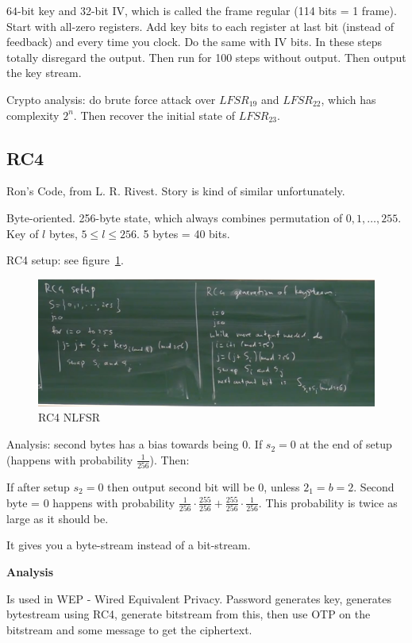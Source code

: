 \documentclass[language=english,number=]{homework}
\begin{document}
$64$-bit key and 32-bit IV, which is called the frame regular (114 bits = 1 frame).
Start with all-zero registers.
Add key bits to each register at last bit (instead of feedback) and every time you clock.
Do the same with IV bits.
In these steps totally disregard the output.
Then run for 100 steps without output.
Then output the key stream.

Crypto analysis: do brute force attack over $LFSR_{19}$ and $LFSR_{22}$, which has complexity $2^n$.
Then recover the initial state of $LFSR_{23}$.

\subsection{RC4}

Ron's Code, from L. R. Rivest.
Story is kind of similar unfortunately.

Byte-oriented.
    256-byte state, which always combines permutation of $0, 1, \dots, 255$.
    Key of $l$ bytes, $5 \le l \le 256$.
    5 bytes = 40 bits.

    RC4 setup: see figure~\ref{rc4}.

\begin{figure}[h!]
    \centering
    \includegraphics[width=\textwidth]{rc4.PNG}
    \caption{RC4 NLFSR}
    \label{rc4}
\end{figure}

    Analysis: second bytes has a bias towards being 0.
    If $s_2 = 0$ at the end of setup (happens with probability $\frac{1}{256}$).
    Then:


    If after setup $s_2 = 0$ then output second bit will be $0$, unless $2_1 = b = 2$.
    Second byte = 0 happens with probability $\frac{1}{256} \cdot \frac{255}{256} + \frac{255}{256} \cdot \frac{1}{256}$.
    This probability is twice as large as it should be.

    It gives you a byte-stream instead of a bit-stream.

\textbf{Analysis}

    Is used in WEP - Wired Equivalent Privacy.
    Password generates key, generates bytestream using RC4, generate bitstream from this, then use OTP on the bitstream and some message to get the ciphertext.
\end{document}
